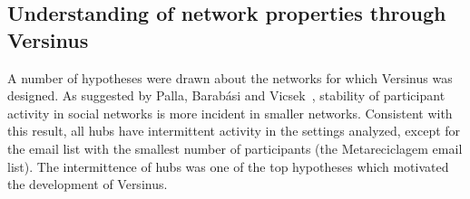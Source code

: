 																																																																																																																																																																																																																																																																																																																																																																																																															\subsection{Understanding of network properties through Versinus}
																																																																																																																																																																																																																																																																																																																																																																																																															A number of hypotheses were drawn about the networks for which Versinus was designed.
																																																																																																																																																																																																																																																																																																																																																																																																															As suggested by Palla, Barab\'asi and Vicsek~\cite{barabasiEvo}, stability of participant activity in social networks is more incident in smaller networks.
																																																																																																																																																																																																																																																																																																																																																																																																															Consistent with this result, all hubs have intermittent activity in the settings analyzed, except for the email list with the smallest number of participants (the Metareciclagem email list).
																																																																																																																																																																																																																																																																																																																																																																																																															The intermittence of hubs was one of the top hypotheses which motivated the development of Versinus.
